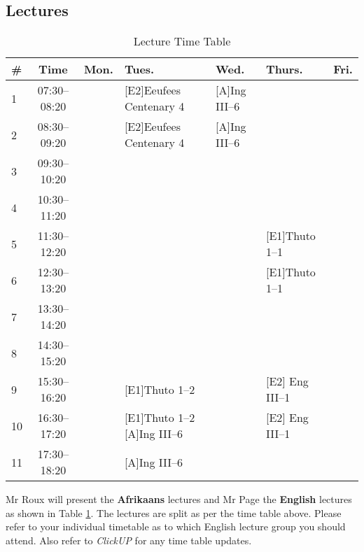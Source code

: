     \subsection{Lectures}
        \begin{table}[!h]
            \begin{center}
             \begin{tabular}{|l|c|p{1.4cm}|p{2.6cm}|p{2.1cm}|p{2.6cm}|p{1.4cm}|}
                 \hline
                 {\bf \#} & {\bf Time} & {\bf Mon.} & {\bf Tues.} & {\bf Wed.} &
                 {\bf Thurs.} & {\bf Fri.} \\
                 \hline
                 1  & 07:30--08:20 &  & [E2]Eeufees Centenary 4 & [A]Ing III--6 &  & \\ \hline
                 2  & 08:30--09:20 &  & [E2]Eeufees Centenary 4 & [A]Ing III--6 &  & \\ \hline
                 3  & 09:30--10:20 &  &  &  &  & \\ \hline
                 4  & 10:30--11:20 &  &  &  &  & \\ \hline
                 5  & 11:30--12:20 &  &  &  & [E1]Thuto 1--1 & \\ \hline
                 6  & 12:30--13:20 &  &  &  & [E1]Thuto 1--1 & \\ \hline
                 7  & 13:30--14:20 &  &  &  &  & \\ \hline
                 8  & 14:30--15:20 &  &  &  &  & \\ \hline
                 9  & 15:30--16:20 &  & [E1]Thuto 1--2 &  & [E2] Eng III--1 & \\ \hline
                 10 & 16:30--17:20 &  & [E1]Thuto 1--2 [A]Ing III--6 &  & [E2] Eng III--1 & \\ \hline
                 11 & 17:30--18:20 &  & [A]Ing III--6 &  &  & \\
                 \hline
             \end{tabular}
             \caption{Lecture Time Table}
            \label{tab:lectures}
            \end{center}
        \end{table}

        Mr Roux will present the \textbf{Afrikaans} lectures and Mr Page the
        \textbf{English} lectures as shown in Table \ref{tab:lectures}. The
        lectures are split as per the time table above. Please refer to your
        individual timetable as to which English lecture group you should
        attend. Also refer to {\it ClickUP} for any time table updates.

